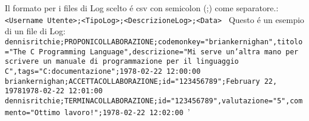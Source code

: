 Il formato per i files di Log scelto é csv con semicolon (;) come separatore.:
\newline
\texttt{
	<Username Utente>;<TipoLog>;<DescrizioneLog>;<Data>
}
\newline
Questo é un esempio di un file di Log:
\newline
\texttt{
	dennisritchie;PROPONICOLLABORAZIONE;codemonkey="briankernighan",titolo="The C Programming Language",descrizione="Mi serve un'altra mano per scrivere un manuale di programmazione per il linguaggio C",tags="C:documentazione";1978-02-22 12:00:00 \newline
	briankernighan;ACCETTACOLLABORAZIONE;id="123456789";February 22, 19781978-02-22 12:01:00 \newline
	dennisritchie;TERMINACOLLABORAZIONE;id="123456789",valutazione="5",commento="Ottimo lavoro!";1978-02-22 12:02:00 \newline
}'
\pagebreak